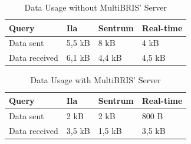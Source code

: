\begin{table}[!h]
\caption{Data Usage without MultiBRIS' Server}
\label{tab:without}
\begin{center}
    \begin{tabular}{ |  l  |  l  |  l  |  l  |}
    \hline
    Query & Ila & Sentrum & Real-time\\ \hline
    Data sent & 5,5 kB & 8 kB & 4 kB\\ \hline
    Data received & 6,1 kB & 4,4 kB & 4,5 kB \\ \hline
    \end{tabular}
\end{center}
\end{table}

\begin{table}[!h]
\caption{Data Usage with MultiBRIS' Server}
\label{tab:with}
\begin{center}
    \begin{tabular}{ |  l  |  l  |  l  |  l  |}
    \hline
    Query & Ila & Sentrum & Real-time\\ \hline
    Data sent & 2 kB &  2 kB & 800 B\\ \hline
    Data  received & 3,5 kB & 1,5 kB & 3,5 kB \\ \hline
    \end{tabular}
\end{center}
\end{table}
